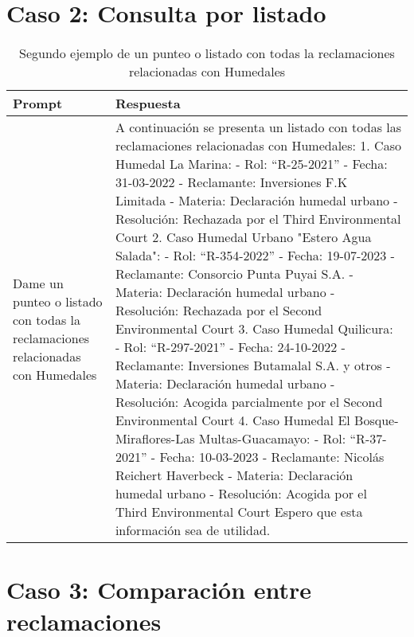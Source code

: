 \section{Caso 2: Consulta por listado}

\begin{table}[ht!]
    \centering
    \caption[Ejemplo: Segundo Prompt]{Segundo ejemplo de un punteo o listado con todas la reclamaciones relacionadas con Humedales}
    \begin{tabular}{p{3cm}p{12cm}}
        \toprule
        \textbf{Prompt} & \textbf{Respuesta} \\
        \hline\hline
        Dame un punteo o listado con todas la reclamaciones relacionadas con Humedales& A continuación se presenta un listado con todas las reclamaciones relacionadas con Humedales: 1. Caso Humedal La Marina: - Rol: ``R-25-2021'' - Fecha: 31-03-2022 - Reclamante: Inversiones F.K Limitada - Materia: Declaración humedal urbano - Resolución: Rechazada por el Third Environmental Court 2. Caso Humedal Urbano "Estero Agua Salada": - Rol: ``R-354-2022'' - Fecha: 19-07-2023 - Reclamante: Consorcio Punta Puyai S.A. - Materia: Declaración humedal urbano - Resolución: Rechazada por el Second Environmental Court 3. Caso Humedal Quilicura: - Rol: ``R-297-2021'' - Fecha: 24-10-2022 - Reclamante: Inversiones Butamalal S.A. y otros - Materia: Declaración humedal urbano - Resolución: Acogida parcialmente por el Second Environmental Court 4. Caso Humedal El Bosque-Miraflores-Las Multas-Guacamayo: - Rol: ``R-37-2021'' - Fecha: 10-03-2023 - Reclamante: Nicolás Reichert Haverbeck - Materia: Declaración humedal urbano - Resolución: Acogida por el Third Environmental Court Espero que esta información sea de utilidad.  \\
        \bottomrule
    \end{tabular}
    \label{tb1:prompt1}
\end{table}


\section{Caso 3: Comparación entre reclamaciones}

